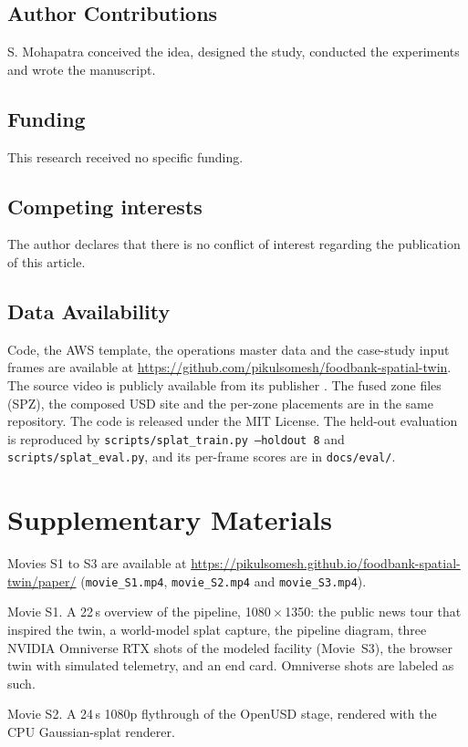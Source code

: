 \documentclass{article}
\newcommand{\code}[1]{\texttt{\small #1}}
\begin{document}
\subsection*{Author Contributions}
S. Mohapatra conceived the idea, designed the study, conducted the
experiments and wrote the manuscript.

\subsection*{Funding}
This research received no specific funding.

\subsection*{Competing interests}
The author declares that there is no conflict of interest regarding the
publication of this article.

\subsection*{Data Availability}
Code, the AWS template, the operations master data and the case-study input
frames are available at
\url{https://github.com/pikulsomesh/foodbank-spatial-twin}. The source video
is publicly available from its publisher \cite{kxxv2026ctfb}. The fused zone
files (SPZ), the composed USD site and the per-zone placements are in the same
repository. The code is released under the MIT License. The held-out
evaluation is reproduced by \code{scripts/splat\_train.py --holdout 8} and
\code{scripts/splat\_eval.py}, and its per-frame scores are in
\code{docs/eval/}.

\section*{Supplementary Materials}
Movies S1 to S3 are available at
\url{https://pikulsomesh.github.io/foodbank-spatial-twin/paper/}
(\code{movie\_S1.mp4}, \code{movie\_S2.mp4} and \code{movie\_S3.mp4}).

Movie S1. A 22\,s overview of the pipeline, 1080\,$\times$\,1350: the public
news tour that inspired the twin, a world-model splat capture, the pipeline
diagram, three NVIDIA Omniverse RTX shots of the modeled facility (Movie~S3),
the browser twin with simulated telemetry, and an end card. Omniverse shots are
labeled as such.

Movie S2. A 24\,s 1080p flythrough of the OpenUSD stage, rendered with the CPU
Gaussian-splat renderer.
\end{document}
